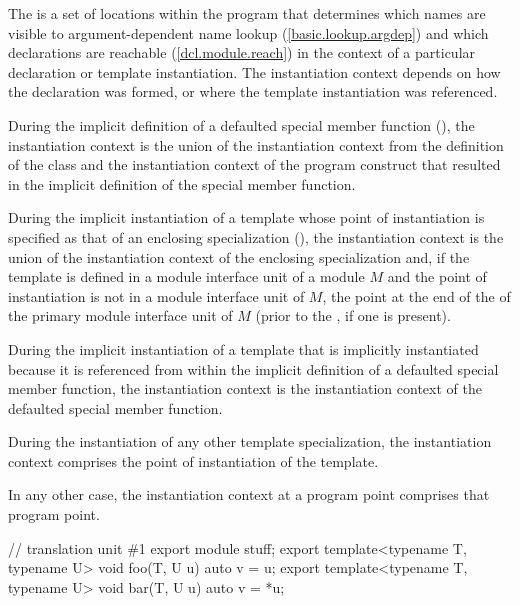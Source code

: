 \begin{std.txt}\color{addclr}
\resetalinea[0]
\alinea
The  is a set of locations within the program
that determines which names are visible to argument-dependent name lookup
(\ref{basic.lookup.argdep})
and which declarations are reachable (\ref{dcl.module.reach})
in the context of a particular declaration or template instantiation.
The instantiation context depends on how the declaration was formed,
or where the template instantiation was referenced.

\alinea
During the implicit definition of a defaulted special member function
(),
the instantiation context is the union of
the instantiation context from the definition of the class and
the instantiation context of the program construct that
resulted in the implicit definition of the special member function.

\alinea
During the implicit instantiation of a template
whose point of instantiation is specified as
that of an enclosing specialization (),
the instantiation context is the union of
the instantiation context of the enclosing specialization and,
if the template is defined in a module interface unit of a module $M$
and the point of instantiation is not in a module interface unit of $M$,
the point at the end of the
 of the
primary module interface unit of $M$
(prior to the ,
if one is present).

\alinea
During the implicit instantiation of a template
that is implicitly instantiated because it is referenced
from within the implicit definition of a defaulted special member function,
the instantiation context is the instantiation context of
the defaulted special member function.

\alinea
During the instantiation of any other template specialization,
the instantiation context comprises the point of instantiation
of the template.

\alinea
In any other case, the instantiation context at a program point comprises
that program point.

\alinea
\begin{example}
\begin{codeblock}
// translation unit \#1
export module stuff;
export template<typename T, typename U> void foo(T, U u) { auto v = u; }
export template<typename T, typename U> void bar(T, U u) { auto v = *u; }


\end{codeblock}
\end{example}
\end{std.txt}
